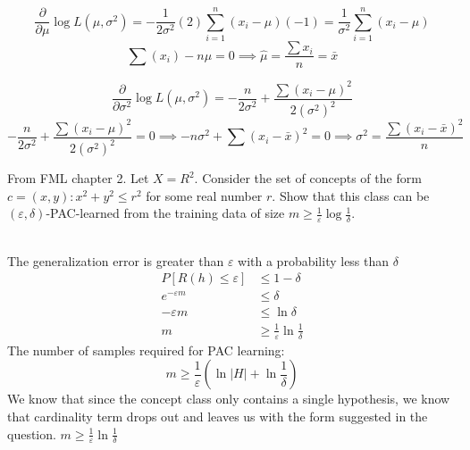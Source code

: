 \documentclass[draft]{exam} %
\renewcommand{\epsilon}{\varepsilon}
\theoremstyle{definition} \newtheorem*{defn}{Definition}
\begin{document}
\begin{questions}
\begin{solution}
$$\frac{\partial}{\partial \mu} \log{L{(\mu , \sigma^2)}} = -\frac{1}{2\sigma^2} (2)\sum_{i=1}^n (x_i - \mu)(-1)= \frac{1}{\sigma^2}\sum_{i=1}^n (x_i - \mu)$$
$$\sum(x_i) - n \mu = 0 \implies \hat\mu = \frac{\sum x_i}{n} = \bar{x}$$

$$\frac{\partial}{\partial \sigma^2} \log{L{(\mu , \sigma^2)}} = -\frac{n}{2\sigma^2} + \frac{\sum(x_i-\mu)^2}{2(\sigma^2)^2}$$
$$-\frac{n}{2\sigma^2} + \frac{\sum(x_i-\mu)^2}{2(\sigma^2)^2} = 0 \implies -n\sigma^2 + \sum(x_i-\bar{x})^2 = 0 \implies \hat{\sigma^2} = \frac{\sum(x_i-\bar{x})^2}{n}$$

\end{solution} %

\question From FML chapter 2. Let $X = R^2$. Consider the set of concepts of the form $c = (x, y) : x^2 + y^2 \leq r^2$
for some real number $r$. Show that this class can be $(\epsilon , \delta)$-PAC-learned from the training data of size
$m \geq \frac{1}{\epsilon}\log\frac{1}{\delta}$.
\begin{solution} \\%
The generalization error is greater than $\epsilon$ with a probability less than $\delta$
\begin{align*}
P[R(h)\leq \epsilon] & \leq 1 - \delta \\
e^{-\epsilon m} & \leq \delta \\
-\epsilon m & \leq \ln \delta \\
m & \geq \frac{1}{\epsilon}\ln\frac{1}{\delta}
\end{align*}
The number of samples required for PAC learning:\\
$$m \geq \frac{1}{\epsilon} (\ln |H| + \ln\frac{1}{\delta})$$
We know that since the concept class only contains a single hypothesis, we know that cardinality term drops out and leaves us with the form suggested in the question. $m \geq \frac{1}{\epsilon}\ln\frac{1}{\delta}$
\end{solution} %
\vfill

\end{questions} 
\end{document}
